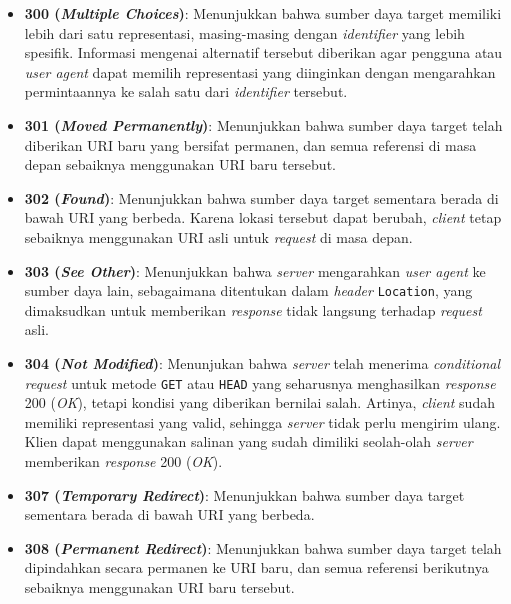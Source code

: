 \begin{itemize}

    \item \textbf{300 (\textit{Multiple Choices})}: Menunjukkan bahwa sumber daya target memiliki lebih dari satu representasi, masing-masing dengan \textit{identifier} yang lebih spesifik. Informasi mengenai alternatif tersebut diberikan agar pengguna atau \textit{user agent} dapat memilih representasi yang diinginkan dengan mengarahkan permintaannya ke salah satu dari \textit{identifier} tersebut.
  
    \item \textbf{301 (\textit{Moved Permanently})}: Menunjukkan bahwa sumber daya target telah diberikan URI baru yang bersifat permanen, dan semua referensi di masa depan sebaiknya menggunakan URI baru tersebut.
  
    \item \textbf{302 (\textit{Found})}: Menunjukkan bahwa sumber daya target sementara berada di bawah URI yang berbeda. Karena lokasi tersebut dapat berubah, \textit{client} tetap sebaiknya menggunakan URI asli untuk \textit{request} di masa depan.
  
    \item \textbf{303 (\textit{See Other})}: Menunjukkan bahwa \textit{server} mengarahkan \textit{user agent} ke sumber daya lain, sebagaimana ditentukan dalam \textit{header} \texttt{Location}, yang dimaksudkan untuk memberikan \textit{response} tidak langsung terhadap \textit{request} asli.
  
    \item \textbf{304 (\textit{Not Modified})}: Menunjukan bahwa \textit{server} telah menerima \textit{conditional request} untuk metode \texttt{GET} atau \texttt{HEAD} yang seharusnya menghasilkan \textit{response} 200 (\textit{OK}), tetapi kondisi yang diberikan bernilai salah. Artinya, \textit{client} sudah memiliki representasi yang valid, sehingga \textit{server} tidak perlu mengirim ulang. Klien dapat menggunakan salinan yang sudah dimiliki seolah-olah \textit{server} memberikan \textit{response} 200 (\textit{OK}).
 
    \item \textbf{307 (\textit{Temporary Redirect})}: Menunjukkan bahwa sumber daya target sementara berada di bawah URI yang berbeda.
  
    \item \textbf{308 (\textit{Permanent Redirect})}: Menunjukkan bahwa sumber daya target telah dipindahkan secara permanen ke URI baru, dan semua referensi berikutnya sebaiknya menggunakan URI baru tersebut.
  
\end{itemize}

